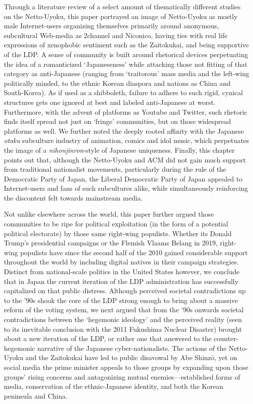 \documentclass[10pt,british,A4paper,oneside]{memoir}
\begin{document}
Through a literature review of a select amount of thematically different
studies on the Netto-Uyoku, this paper portrayed an image of Netto-Uyoku
as mostly male Internet-users organizing themselves primarily around
anonymous, subcultural Web-media as 2channel and Niconico, having ties
with real life expressions of xenophobic sentiment such as the
Zaitokukai, and being supportive of the LDP. A sense of community is
built around rhetorical devices perpetuating the idea of a romanticized
`Japaneseness' while attacking those not fitting of that category as
anti-Japanese (ranging from `traitorous' mass media and the left-wing
politically minded, to the ethnic Korean diaspora and nations as China
and South-Korea). As if used as a shibboleth, failure to adhere to such
rigid, cynical structures gets one ignored at best and labeled
anti-Japanese at worst. Furthermore, with the advent of platforms as
Youtube and Twitter, such rhetoric finds itself spread not just on
`fringe' communities, but on those widespread platforms as well. We
further noted the deeply rooted affinity with the Japanese \emph{otaku}
subculture industry of animation, comics and idol music, which
perpetuates the image of a \emph{nihonjinron}-style of Japanese
uniqueness. Finally, this chapter points out that, although the Netto-Uyoku and ACM did not gain much support from traditional nationalist movements, particularly during the rule of the Democratic Party of Japan, the Liberal Democratic
Party of Japan appealed to Internet-users and fans of such subcultures alike,
while simultaneously reinforcing the discontent felt towards mainstream media.

Not unlike elsewhere across the world, this paper further argued those
communities to be ripe for political exploitation (in the form of a
potential political electorate) by those same right-wing populists.
Whether its Donald Trump's presidential campaigns or the Flemish Vlaams Belang in 2019,
right-wing populists have since the second half of the 2010 gained
considerable support throughout the world by including digital natives
in their campaign strategies. Distinct from national-scale politics in
the United States however, we conclude that in Japan the current
iteration of the LDP administration has successfully capitalized on that
public distress. Although perceived societal contradictions up to the
'90s shook the core of the LDP strong enough to bring about a massive
reform of the voting system, we next argued that from the '90s onwards
societal contradictions between the `hegemonic ideology' and the
perceived reality (seen to its inevitable conclusion with the 2011
Fukushima Nuclear Disaster) brought about a new iteration of the LDP, or
rather one that answered to the counter-hegemonic narrative of the
Japanese cyber-nationalists. The actions of the Netto-Uyoku and the
Zaitokukai have led to public disavowal by Abe Shinzō, yet on
social media the prime minister appeals to those groups by expanding
upon those groups' rising concerns and antagonizing mutual enemies---established forms of media, conservation of the ethnic-Japanese
identity, and both the Korean peninsula and
China.
\end{document}
